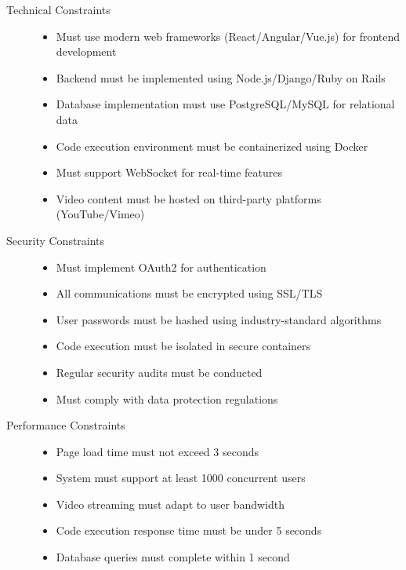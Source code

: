 \documentclass[a4paper, 11pt]{scrreprt}
\begin{document}
\begin{description}
    \item[Technical Constraints]
        \begin{itemize}
            \item Must use modern web frameworks (React/Angular/Vue.js) for frontend development
            \item Backend must be implemented using Node.js/Django/Ruby on Rails
            \item Database implementation must use PostgreSQL/MySQL for relational data
            \item Code execution environment must be containerized using Docker
            \item Must support WebSocket for real-time features
            \item Video content must be hosted on third-party platforms (YouTube/Vimeo)
        \end{itemize}
    
    \item[Security Constraints]
        \begin{itemize}
            \item Must implement OAuth2 for authentication
            \item All communications must be encrypted using SSL/TLS
            \item User passwords must be hashed using industry-standard algorithms
            \item Code execution must be isolated in secure containers
            \item Regular security audits must be conducted
            \item Must comply with data protection regulations
        \end{itemize}
    
    \item[Performance Constraints]
        \begin{itemize}
            \item Page load time must not exceed 3 seconds
            \item System must support at least 1000 concurrent users
            \item Video streaming must adapt to user bandwidth
            \item Code execution response time must be under 5 seconds
            \item Database queries must complete within 1 second
        \end{itemize}
    

\end{description}
\end{document}
